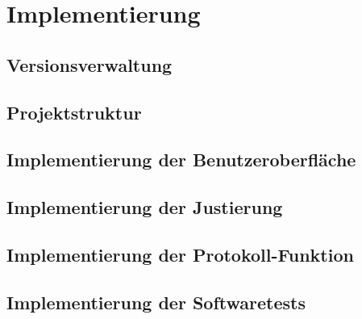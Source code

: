\section{Implementierung}

\subsection{Versionsverwaltung}

\subsection{Projektstruktur}

\subsection{Implementierung der Benutzeroberfläche}

\subsection{Implementierung der Justierung}

\subsection{Implementierung der Protokoll-Funktion}

\subsection{Implementierung der Softwaretests}